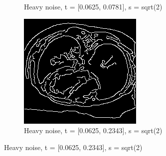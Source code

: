 \begin{figure}[H]
\begin{subfigure}{.5\textwidth}
    \caption{Heavy noise, t = [0.0625, 0.0781], s = sqrt(2)}
    \label{fig:h_noise_sens_h_thres}
  \end{subfigure}%
  \begin{subfigure}{.5\textwidth}
    \centering
    \includegraphics[width=.9\textwidth]{./edgedetection/heavy_noise/h_noise_insens_h_thres}
    \caption{Heavy noise, t = [0.0625, 0.2343], s = sqrt(2)}
    \label{fig:h_noise_insens_h_thres}
  \end{subfigure}%
  
\end{figure}

